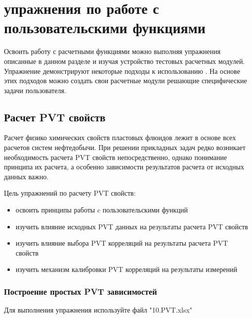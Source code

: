 \chapter{упражнения по работе с пользовательскими функциями \unf}

Освоить работу с расчетными функциями \unf можно выполняя упражнения описанные в данном разделе и изучая устройство тестовых расчетных модулей. Упражнение демонстрируют некоторые подходы к использованию \unf. На основе этих подходов можно создать свои расчетные модули решающие специфические задачи пользователя. 

\section{Расчет PVT свойств}

Расчет физико химических свойств пластовых флюидов лежит в основе всех расчетов систем нефтедобычи. При решении прикладных задач редко возникает необходимость расчета PVT свойств непосредственно, однако понимание принципа их расчета, а особенно зависимости результатов расчета от исходных данных важно.
	
Цель упражнений по расчету PVT свойств:
\begin{itemize}	
	\item 	освоить принципы работы c пользовательскими функций \unf 
	\item 	изучить влияние исходных PVT данных на результаты расчета PVT свойств
	\item 	изучить влияние выбора PVT корреляций на результаты расчета PVT свойств
	\item 	изучить механизм калибровки PVT корреляций на результаты измерений
\end{itemize}
	 
	 
\subsection{Построение простых PVT зависимостей}

Для выполнения упражнения используйте файл "10.PVT.xlsx"

